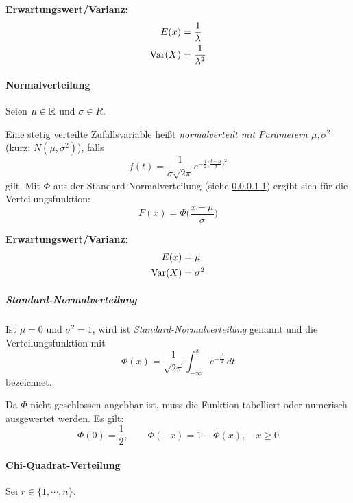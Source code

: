 					\textbf{Erwartungswert/Varianz:}
					\begin{align*}
						E(x)    & = \frac{1}{\lambda}   \\
						\operatorname{Var}(X) & = \frac{1}{\lambda^2}
					\end{align*}

				\paragraph{Normalverteilung}
					Seien \( \mu \in \mathbb{R} \) und \( \sigma \in R \).

					Eine stetig verteilte Zufallsvariable heißt \textit{normalverteilt mit Parametern \( \mu, \sigma^2 \)} (kurz: \( N(\mu, \sigma^2) \)), falls
					\begin{equation*}
						f(t) = \frac{1}{\sigma \sqrt{2\pi}} e^{ -\frac{1}{2} \big( \frac{t - \mu}{\sigma} \big) ^ 2 }
					\end{equation*}
					gilt. Mit \( \Phi \) aus der Standard-Normalverteilung (siehe \ref{sec:snd}) ergibt sich für die Verteilungsfunktion:
					\begin{equation*}
						F(x) = \Phi\bigg( \frac{x - \mu}{\sigma} \bigg)
					\end{equation*}

					\textbf{Erwartungswert/Varianz:}
					\begin{align*}
						E(x)    & = \mu      \\
						\operatorname{Var}(X) & = \sigma^2
					\end{align*}

					\subparagraph{Standard-Normalverteilung}
						\label{sec:snd}

						Ist \( \mu = 0 \) und \( \sigma^2 = 1 \), wird ist \textit{Standard-Normalverteilung} genannt und die Verteilungsfunktion mit
						\begin{equation*}
							\Phi(x) = \frac{1}{\sqrt{2\pi}} \int_{-\infty}^{x} \! e^{-\frac{t^2}{2}} \, dt
						\end{equation*}
						bezeichnet.

						Da \( \Phi \) nicht geschlossen angebbar ist, muss die Funktion tabelliert oder numerisch ausgewertet werden. Es gilt:
						\begin{equation*}
							\Phi(0) = \frac{1}{2}, \qquad \Phi(-x) = 1 - \Phi(x), \quad x \geq 0
						\end{equation*}

				\paragraph{Chi-Quadrat-Verteilung}
					Sei \( r \in \{ 1, \cdots, n \} \).


